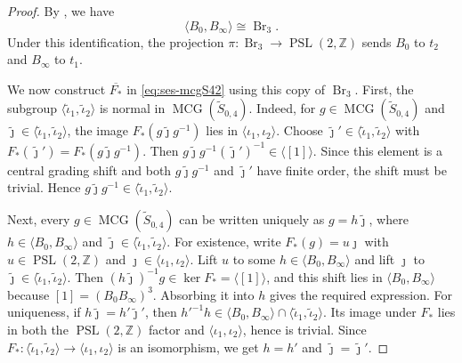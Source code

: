 \documentclass[11pt,a4paper,reqno]{amsart}%
\theoremstyle{plain}
\theoremstyle{definition}
\numberwithin{equation}{section}
\numberwithin{equation}{section}
\def\<{\langle}
\def\>{\rangle}
\def\ZZ{\mathbb{Z}}
\newcommand{\MCG}{\operatorname{MCG}}
\def\Br{\operatorname{Br}}
\def\PSL{\operatorname{PSL}}
\begin{document}
\begin{proof}
By , we have
\[
\langle B_0,B_\infty\rangle\cong \Br_3.
\]
Under this identification, the projection $\pi:\Br_3\to\PSL(2,\ZZ)$ sends
$B_0$ to $t_2$ and $B_\infty$ to $t_1$.

 We now construct $\overline{F_*}$ in \eqref{eq:ses-mcgS42} using this copy of $\Br_3$.   First, the subgroup
$\langle\tilde\iota_1,\tilde\iota_2\rangle$ is normal in
$\MCG(\widetilde{S}_{0,4})$. Indeed, for
$g\in\MCG(\widetilde{S}_{0,4})$ and
$\widetilde\jmath\in\langle\tilde\iota_1,\tilde\iota_2\rangle$, the
image $F_*(g\widetilde\jmath g^{-1})$ lies in
$\<\iota_1,\iota_2\>$. Choose
$\widetilde\jmath'\in\langle\tilde\iota_1,\tilde\iota_2\rangle$ with
$F_*(\widetilde\jmath')=F_*(g\widetilde\jmath g^{-1})$. Then
$g\widetilde\jmath g^{-1}(\widetilde\jmath')^{-1}\in\langle[1]\rangle$. Since
this element is a central grading shift and both
$g\widetilde\jmath g^{-1}$ and $\widetilde\jmath'$ have finite order, the shift
must be trivial. Hence
$g\widetilde\jmath g^{-1}\in\langle\tilde\iota_1,\tilde\iota_2\rangle$.

Next, every $g\in\MCG(\widetilde{S}_{0,4})$ can be written uniquely as
$g=h\widetilde\jmath$, where
$h\in\langle B_0,B_\infty\rangle$ and
$\widetilde\jmath\in\langle\tilde\iota_1,\tilde\iota_2\rangle$. For
existence, write $F_*(g)=u\jmath$ with $u\in\PSL(2,\ZZ)$ and
$\jmath\in\<\iota_1,\iota_2\>$. Lift $u$ to some
$h\in\langle B_0,B_\infty\rangle$ and lift $\jmath$ to
$\widetilde\jmath\in\langle\tilde\iota_1,\tilde\iota_2\rangle$. Then
$(h\widetilde\jmath)^{-1}g\in\ker F_*=\langle[1]\rangle$, and this shift lies
in $\langle B_0,B_\infty\rangle$ because $[1]=(B_0B_\infty)^3$. Absorbing it
into $h$ gives the required expression. For uniqueness, if
$h\widetilde\jmath=h'\widetilde\jmath'$, then
${h'}^{-1}h\in\langle B_0,B_\infty\rangle\cap
\langle\tilde\iota_1,\tilde\iota_2\rangle$. Its image under $F_*$ lies
in both the $\PSL(2,\ZZ)$ factor and $\<\iota_1,\iota_2\>$, hence is
trivial. Since
$F_*:\langle\tilde\iota_1,\tilde\iota_2\rangle\to
\<\iota_1,\iota_2\>$ is an isomorphism, we get $h=h'$ and
$\widetilde\jmath=\widetilde\jmath'$.


\end{proof}
\end{document}
